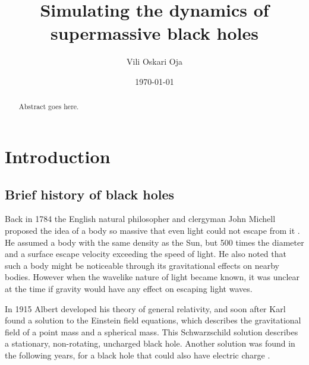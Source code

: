 \documentclass[english, oneside]{HYgradu}
\title{Simulating the dynamics of supermassive black holes}
\author{Vili Oskari Oja}
\date{\today}
\begin{document}
\setlength{\parindent}{1cm}
\setlength{\parskip}{0cm}
\maketitle

\begin{abstract}
Abstract goes here.
\end{abstract}

\mytableofcontents


\setlength{\parindent}{.75cm}
\setlength{\parskip}{.6cm}
\chapter{Introduction}


\section{Brief history of black holes}

Back in 1784 the English natural philosopher and clergyman John Michell proposed the idea of a body so massive that even light could not escape from it \citep{michell:1784}. He assumed a body with the same density as the Sun, but 500 times the diameter and a surface escape velocity exceeding the speed of light. He also noted that such a body might be noticeable through its gravitational effects on nearby bodies. However when the wavelike nature of light became known, it was unclear at the time if gravity would have any effect on escaping light waves.

In 1915 Albert \cite{einstein:1915} developed his theory of general relativity, and soon after Karl \cite{schwarzschild:1916} found a solution to the Einstein field equations, which describes the gravitational field of a point mass and a spherical mass. This Schwarzschild solution describes a stationary, non-rotating, uncharged black hole. Another solution was found in the following years, for a black hole that could also have electric charge \citep{reissner:1916, nordstrom:1918}.
\end{document}
